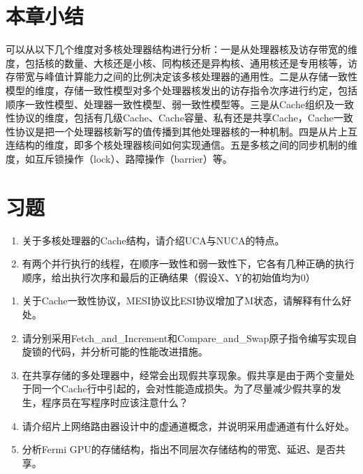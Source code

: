 \documentclass[]{ctexbook}
\providecommand{\tightlist}{%
  \setlength{\itemsep}{0pt}\setlength{\parskip}{0pt}}
\begin{document}
\hypertarget{ux672cux7ae0ux5c0fux7ed3-9}{%
\section{本章小结}\label{ux672cux7ae0ux5c0fux7ed3-9}}

可以从以下几个维度对多核处理器结构进行分析：一是从处理器核及访存带宽的维度，包括核的数量、大核还是小核、同构核还是异构核、通用核还是专用核等，访存带宽与峰值计算能力之间的比例决定该多核处理器的通用性。二是从存储一致性模型的维度，存储一致性模型对多个处理器核发出的访存指令次序进行约定，包括顺序一致性模型、处理器一致性模型、弱一致性模型等。三是从Cache组织及一致性协议的维度，包括有几级Cache、Cache容量、私有还是共享Cache，Cache一致性协议是把一个处理器核新写的值传播到其他处理器核的一种机制。四是从片上互连结构的维度，即多个核处理器核间如何实现通信。五是多核之间的同步机制的维度，如互斥锁操作（lock）、路障操作（barrier）等。

\hypertarget{ux4e60ux9898-10}{%
\section{习题}\label{ux4e60ux9898-10}}

\begin{enumerate}
\def\labelenumi{\arabic{enumi}.}
\tightlist
\item
  关于多核处理器的Cache结构，请介绍UCA与NUCA的特点。
\item
  有两个并行执行的线程，在顺序一致性和弱一致性下，它各有几种正确的执行顺序，给出执行次序和最后的正确结果（假设X、Y的初始值均为0）
\end{enumerate}

\begin{enumerate}
\def\labelenumi{\arabic{enumi}.}
\setcounter{enumi}{2}
\tightlist
\item
  关于Cache一致性协议，MESI协议比ESI协议增加了M状态，请解释有什么好处。
\item
  请分别采用Fetch\_and\_Increment和Compare\_and\_Swap原子指令编写实现自旋锁的代码，并分析可能的性能改进措施。
\item
  在共享存储的多处理器中，经常会出现假共享现象。假共享是由于两个变量处于同一个Cache行中引起的，会对性能造成损失。为了尽量减少假共享的发生，程序员在写程序时应该注意什么？
\item
  请介绍片上网络路由器设计中的虚通道概念，并说明采用虚通道有什么好处。
\item
  分析Fermi GPU的存储结构，指出不同层次存储结构的带宽、延迟、是否共享。
\end{enumerate}
\end{document}
